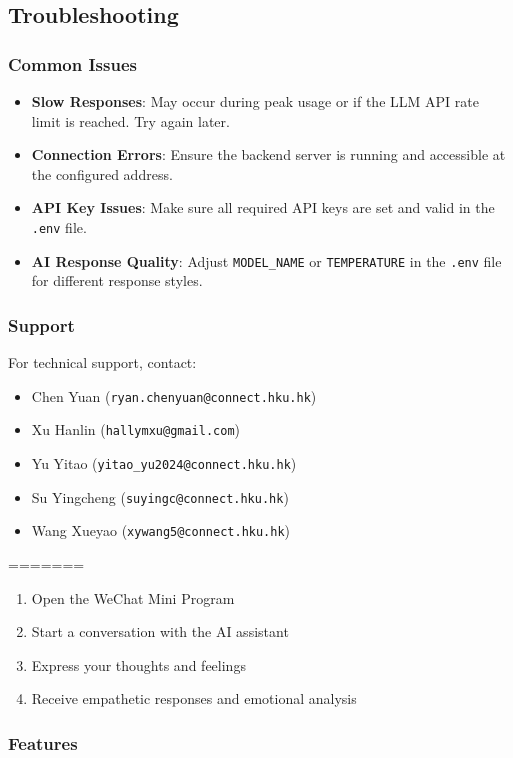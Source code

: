 \subsection{Troubleshooting}

\subsubsection{Common Issues}
\begin{itemize}
    \item \textbf{Slow Responses}: May occur during peak usage or if the LLM API rate limit is reached. Try again later.
    \item \textbf{Connection Errors}: Ensure the backend server is running and accessible at the configured address.
    \item \textbf{API Key Issues}: Make sure all required API keys are set and valid in the \texttt{.env} file.
    \item \textbf{AI Response Quality}: Adjust \texttt{MODEL_NAME} or \texttt{TEMPERATURE} in the \texttt{.env} file for different response styles.
\end{itemize}

\subsubsection{Support}
For technical support, contact:
\begin{itemize}
    \item Chen Yuan (\texttt{ryan.chenyuan@connect.hku.hk})
    \item Xu Hanlin (\texttt{hallymxu@gmail.com})
    \item Yu Yitao (\texttt{yitao_yu2024@connect.hku.hk})
    \item Su Yingcheng (\texttt{suyingc@connect.hku.hk})
    \item Wang Xueyao (\texttt{xywang5@connect.hku.hk})
\end{itemize}
=======

\begin{enumerate}
    \item Open the WeChat Mini Program
    \item Start a conversation with the AI assistant
    \item Express your thoughts and feelings
    \item Receive empathetic responses and emotional analysis
\end{enumerate}

\subsubsection{Features}

